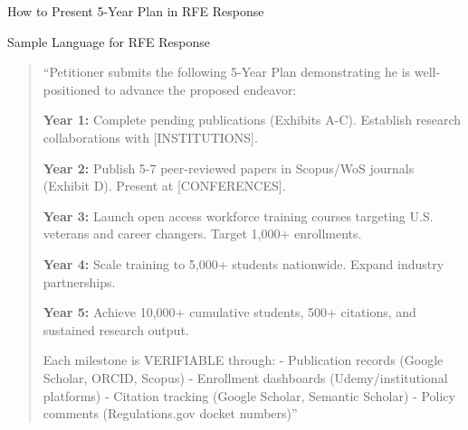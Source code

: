 \documentclass[11pt]{beamer}
\begin{document}
	\begin{frame}{How to Present 5-Year Plan in RFE Response}
		\scriptsize
		\begin{block}{Sample Language for RFE Response}
			\begin{quote}
				``Petitioner submits the following 5-Year Plan demonstrating he is well-positioned to advance the proposed endeavor:
				
				\textbf{Year 1:} Complete pending publications (Exhibits A-C). Establish research collaborations with [INSTITUTIONS].
				
				\textbf{Year 2:} Publish 5-7 peer-reviewed papers in Scopus/WoS journals (Exhibit D). Present at [CONFERENCES].
				
				\textbf{Year 3:} Launch open access workforce training courses targeting U.S. veterans and career changers. Target 1,000+ enrollments.
				
				\textbf{Year 4:} Scale training to 5,000+ students nationwide. Expand industry partnerships.
				
				\textbf{Year 5:} Achieve 10,000+ cumulative students, 500+ citations, and sustained research output.
				
				Each milestone is VERIFIABLE through:
				- Publication records (Google Scholar, ORCID, Scopus)
				- Enrollment dashboards (Udemy/institutional platforms)
				- Citation tracking (Google Scholar, Semantic Scholar)
				- Policy comments (Regulations.gov docket numbers)''
			\end{quote}
		\end{block}
	\end{frame}
	
\end{document}
